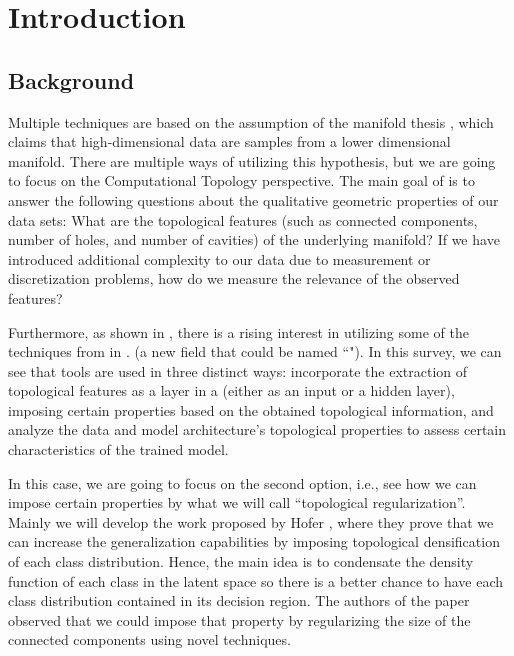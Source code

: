 \documentclass[../main.tex]{subfiles}
\begin{document}
\chapter{Introduction}
\label{ch:introduction}


\section{Background}
\label{sec:background}


Multiple  techniques are based on the assumption of the manifold thesis \cite{fefferman_testing_2016}, which claims that high-dimensional data are samples from a lower dimensional manifold. There are multiple ways of utilizing this hypothesis, but we are going to focus on the Computational Topology perspective. The main goal of  is to answer the following questions about the qualitative geometric properties of our data sets: What are the topological features (such as connected components, number of holes, and number of cavities) of the underlying manifold? If we have introduced additional complexity to our data due to measurement or discretization problems, how do we measure the relevance of the observed features? 


Furthermore, as shown in \cite{hensel_survey_2021}, there is a rising interest in utilizing some of the techniques from  in . (a new field that could be named “"). In this survey, we can see that  tools are used in three distinct ways: incorporate the extraction of topological features as a layer in a  (either as an input or a hidden layer), imposing certain properties based on the obtained topological information, and analyze the data and model architecture's topological properties to assess certain characteristics of the trained model.  

In this case, we are going to focus on the second option, i.e., see how we can impose certain properties by what we will call ``topological regularization''. Mainly we will develop the work proposed by Hofer \etal \cite{hofer_densified_2021}, where they prove that we can increase the generalization capabilities by imposing topological densification of each class distribution. Hence, the main idea is to condensate the density function of each class in the latent space so there is a better chance to have each class distribution contained in its decision region. The authors of the paper observed that we could impose that property by regularizing the size of the connected components using novel  techniques.\\
\end{document}
